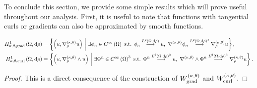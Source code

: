 To conclude this section, we provide some simple results which will prove useful throughout our analysis.
First, it is useful to note that functions with tangential curls or gradients can also be approximated by smooth functions.
\begin{cory} \label{cory:SobSpaceApproxSequences}
	\begin{align*}
		\ktgradSob{\ddom}{\rho} &= \clbracs{ \bracs{u, \ktgrad_{\rho}u} \setVert \exists\phi_n\in\smooth{\ddom} \text{ s.t. } \phi_n\lconv{\ltwo{\ddom}{\rho}}u, \ \ktgrad\phi_n\lconv{\ltwo{\ddom}{\rho}^3}\ktgrad_{\rho}u }, \\
		\ktcurlSob{\ddom}{\rho} &= \clbracs{ \bracs{u, \ktcurl{\rho}u} \setVert \exists\Phi^n\in\smooth{\ddom}^3 \text{ s.t. } \Phi^n\lconv{\ltwo{\ddom}{\rho}^3}u, \ \ktcurl{}\Phi^n\lconv{\ltwo{\ddom}{\rho}^3}\ktgrad_{\rho}u }.
	\end{align*}
\end{cory}
\begin{proof}
	This is a direct consequence of the construction of $W^{\left( \kappa, \theta \right)}_{\mathrm{grad}}$ and $W^{\left( \kappa, \theta \right)}_{\mathrm{curl}}$.
\end{proof}

